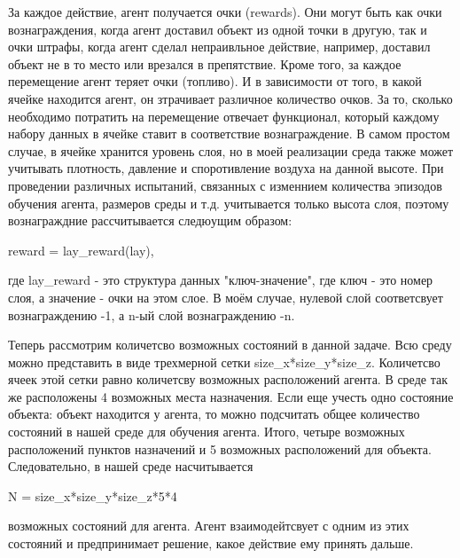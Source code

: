\documentclass[12pt, a4paper]{report}
\theoremstyle{definition}
\theoremstyle{plain}
\theoremstyle{remark}
\theoremstyle{remark}
\theoremstyle{definition}
\begin{document}
За каждое действие, агент получается очки (rewards). Они могут быть как очки вознаграждения, когда агент доставил объект из одной точки в другую, так и очки штрафы, когда агент сделал непраивльное действие, например, доставил объект не в то место или врезался в препятствие. Кроме того, за каждое перемещение агент теряет очки (топливо). И в зависимости от того, в какой ячейке находится агент, он зтрачивает различное количество очков. За то, сколько необходимо потратить на перемещение отвечает функционал, который каждому набору данных в ячейке ставит в соответствие вознаграждение. В самом простом случае, в ячейке хранится уровень слоя, но в моей реализации среда также может учитывать плотность, давление и споротивление воздуха на данной высоте. При проведении различных испытаний, связанных с изменнием количества эпизодов обучения агента, размеров среды и т.д. учитывается только высота слоя, поэтому вознаграждние рассчитывается следюущим образом:
\begin{center}
    reward = lay\_reward(lay),
\end{center}
где lay\_reward - это структура данных "ключ-значение", где ключ - это номер слоя, а значение - очки на этом слое. В моём случае, нулевой слой соответсвует вознаграждению -1, а n-ый слой вознаграждению -n. 

Теперь рассмотрим количетсво возможных состояний в данной задаче. Всю среду можно представить в виде трехмерной сетки size\_x*size\_y*size\_z. Количетсво ячеек этой сетки равно количетсву возможных расположений агента. В среде так же расположены 4 возможных места назначения. Если еще учесть одно состояние объекта: объект находится у агента, то можно подсчитать общее количество состояний в нашей среде для обучения агента. Итого, четыре возможных расположений пунктов назначений и 5 возможных расположений для объекта. Следовательно, в нашей среде насчитывается 
\begin{center}
    N = size\_x*size\_y*size\_z*5*4
\end{center}
возможных состояний для агента. Агент взаимодейтсвует с одним из этих состояний и предпринимает решение, какое действие ему принять дальше.\\
\end{document}
